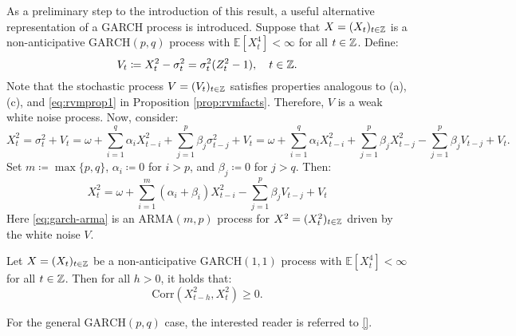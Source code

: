 As a preliminary step to the introduction of this result, a useful alternative representation of a GARCH process is introduced. Suppose that $X=(X_{t})_{t\in\mathbb{Z}}$ is a non-anticipative $\mathrm{GARCH}(p,q)$ process with $\mathbb{E}[X_{t}^{4}]<\infty$ for all $t\in\mathbb{Z}$. Define:
\begin{equation}
    V_{t}\coloneqq X_{t}^{2}-\sigma_{t}^{2}=\sigma_{t}^{2}(Z_{t}^{2}-1),\quad t\in\mathbb{Z}.
\end{equation}
Note that the stochastic process $V=(V_{t})_{t\in\mathbb{Z}}$ satisfies properties analogous to (a), (c), and \eqref{eq:rvmprop1} in Proposition \ref{prop:rvmfacts}. Therefore, $V$ is a weak white noise process. %
Now, consider:
\begin{equation*}
    X_{t}^{2}=\sigma_{t}^{2}+V_{t}=\omega+\sum_{i=1}^{q}\alpha_{i}X_{t-i}^{2}+\sum_{j=1}^{p}\beta_{j}\sigma_{t-j}^{2}+V_{t}=\omega+\sum_{i=1}^{q}\alpha_{i}X_{t-i}^{2}+\sum_{j=1}^{p}\beta_{j}X_{t-j}^{2}-\sum_{j=1}^{p}\beta_{j}V_{t-j}+V_{t}.
\end{equation*}
Set $m\coloneqq\max\{p,q\}$, $\alpha_{i}\coloneqq0$ for $i>p$, and $\beta_{j}\coloneqq0$ for $j>q$. Then:
\begin{equation}\label{eq:garch-arma}
    X_{t}^{2}=\omega+\sum_{i=1}^{m}(\alpha_{i}+\beta_{i})X_{t-i}^{2}-\sum_{j=1}^{p}\beta_{j}V_{t-j}+V_{t}
\end{equation}
Here \eqref{eq:garch-arma} is an $\mathrm{ARMA}(m,p)$ process for $X^{2}=(X_{t}^{2})_{t\in\mathbb{Z}}$ driven by the white noise $V$.
\begin{prop}
Let $X=(X_{t})_{t\in\mathbb{Z}}$ be a non-anticipative $\mathrm{GARCH}(1,1)$ process with $\mathbb{E}[X_{t}^{4}]<\infty$ for all $t\in\mathbb{Z}$. Then for all $h>0$, it holds that:
\begin{equation*}
    \mathrm{Corr}(X_{t-h}^{2},X_{t}^{2})\geq 0.
\end{equation*}
\end{prop}
For the general $\mathrm{GARCH}(p,q)$ case, the interested reader is referred to \ref{}. %
